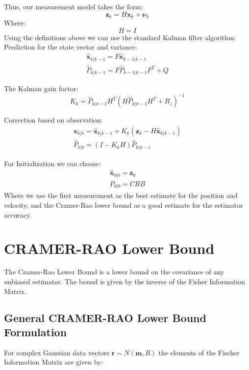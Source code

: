 \documentclass[10pt,a4paper]{report}
\begin{document}
Thus, our measurement model takes the form:
\begin{equation}
\mathbf{z}_{k} = H \mathbf{x}_{k}+ \mathbf{\nu}_{k}
\end{equation}
Where:
\begin{equation}
H=I
\end{equation}
Using the definitions above we can use the standard Kalman filter algorithm:
\\

Prediction for the state vector and variance:
\begin{eqnarray}
\mathbf{\hat{x}}_{{k|k-1}} = F \mathbf{\hat{x}}_{{k-1|k-1}}\\
\hat{P}_{k|k-1} = F \hat{P}_{k-1|k-1}F^T+Q
\end{eqnarray}

The Kalman gain factor:
\begin{equation}
K_k = \hat{P}_{k|k-1} H^T(H\hat{P}_{k|k-1}H^T+R_z)^{-1}
\end{equation}

Correction based on observation:
\begin{eqnarray}
\mathbf{\hat{x}}_{{k|k}} = \mathbf{\hat{x}}_{{k|k-1}} +K_k(\mathbf{z}_k-H\mathbf{\hat{x}}_{{k|k-1}})\\
\hat{P}_{k|k} = (I-K_kH)\hat{P}_{k|k-1}
\end{eqnarray}

For Initialization we can choose:
\begin{eqnarray*}
\mathbf{\hat{x}}_{0|0}=\mathbf{z}_0\\
P_{0|0} = CRB
\end{eqnarray*}
Where we use the first measurement as the best estimate for the position and velocity, and the Cramer-Rao lower bound as a good estimate for the estimator accuracy.

\chapter{CRAMER-RAO Lower Bound}
The Cramer-Rao Lower Bound is a lower bound on the covariance of any unbiased estimator. The bound is given by the inverse of the Fisher Information Matrix. 

\section{General CRAMER-RAO Lower Bound Formulation}
For complex Gaussian data vectors $\mathbf{r} \sim N(\mathbf{m},R)$ the elements of the Fischer Information Matrix are given by:
\end{document}
